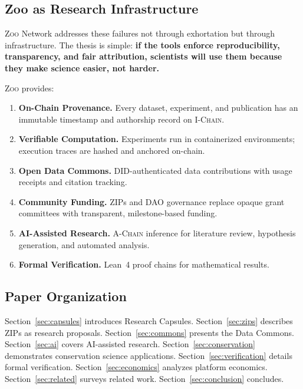 \documentclass[11pt,letterpaper]{article}
\theoremstyle{definition}
\theoremstyle{remark}
\newcommand{\Zoo}{\textsc{Zoo}}
\newcommand{\AChain}{\textsc{A-Chain}}
\newcommand{\IChain}{\textsc{I-Chain}}
\newcommand{\DID}{\textsc{DID}}
\newcommand{\DAO}{\textsc{DAO}}
\newcommand{\ZIP}{\textsc{ZIP}}
\begin{document}
\subsection{Zoo as Research Infrastructure}

\Zoo{} Network addresses these failures not through exhortation but through infrastructure. The thesis is simple: \textbf{if the tools enforce reproducibility, transparency, and fair attribution, scientists will use them because they make science easier, not harder.}

\Zoo{} provides:

\begin{enumerate}
    \item \textbf{On-Chain Provenance.} Every dataset, experiment, and publication has an immutable timestamp and authorship record on \IChain{}.
    \item \textbf{Verifiable Computation.} Experiments run in containerized environments; execution traces are hashed and anchored on-chain.
    \item \textbf{Open Data Commons.} \DID{}-authenticated data contributions with usage receipts and citation tracking.
    \item \textbf{Community Funding.} \ZIP{}s and \DAO{} governance replace opaque grant committees with transparent, milestone-based funding.
    \item \textbf{AI-Assisted Research.} \AChain{} inference for literature review, hypothesis generation, and automated analysis.
    \item \textbf{Formal Verification.} Lean~4 proof chains for mathematical results.
\end{enumerate}

\subsection{Paper Organization}

Section~\ref{sec:capsules} introduces Research Capsules. Section~\ref{sec:zips} describes ZIPs as research proposals. Section~\ref{sec:commons} presents the Data Commons. Section~\ref{sec:ai} covers AI-assisted research. Section~\ref{sec:conservation} demonstrates conservation science applications. Section~\ref{sec:verification} details formal verification. Section~\ref{sec:economics} analyzes platform economics. Section~\ref{sec:related} surveys related work. Section~\ref{sec:conclusion} concludes.

\end{document}
